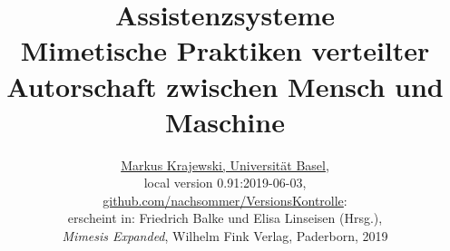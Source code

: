 \documentclass[a4paper,10pt]{article}
\date{}
\begin{document}
%
% 
\title{Assistenzsysteme\\
\normalsize Mimetische Praktiken verteilter\\ 
Autorschaft zwischen Mensch und Maschine}
\author{\href{http://gtm.mewi.unibas.ch}{Markus Krajewski, Universität Basel},\\[3mm]
local version 0.91:2019-06-03,\\
\href{https://github.com/nachsommer/VersionsKontrolle/tree/master/3.Fassung}{github.com/nachsommer/VersionsKontrolle}: \gitVer{}\\[3mm]
erscheint in: Friedrich Balke und Elisa Linseisen (Hrsg.),\\
\emph{Mimesis Expanded}, Wilhelm Fink Verlag, Paderborn, 2019}
\maketitle
\tableofcontents
\newpage
%
\end{document}
